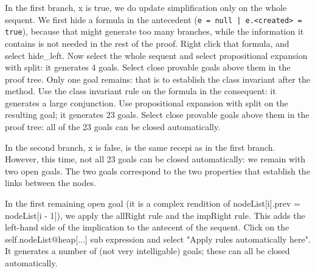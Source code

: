 \documentclass[runningheads]{llncs}
\begin{document}
In the first branch, x is true, we do update simplification only on the whole sequent. We first hide a formula in the antecedent (\texttt{e = null | e.<created> = true}), because that might generate too many branches, while the information it contains is not needed in the rest of the proof. Right click that formula, and select hide\_left. Now select the whole sequent and select propositional expansion with split: it generates 4 goals. Select close provable goals above them in the proof tree. Only one goal remains: that is to establish the class invariant after the method. Use the class invariant rule on the formula in the consequent: it generates a large conjunction. Use propositional expansion with split on the resulting goal; it generates 23 goals. Select close provable goals above them in the proof tree: all of the 23 goals can be closed automatically.

In the second branch, x is false, is the same recepi as in the first branch. However, this time, not all 23 goals can be closed automatically: we remain with two open goals. The two goals correspond to the two properties that establish the links between the nodes.

In the first remaining open goal (it is a complex rendition of nodeList[i].prev = nodeList[i - 1]), we apply the allRight rule and the impRight rule. This adds the left-hand side of the implication to the antecent of the sequent. Click on the self.nodeList@heap[...] sub expression and select "Apply rules automatically here". It generates a number of (not very intelligable) goals; these can all be closed automatically.
\end{document}
